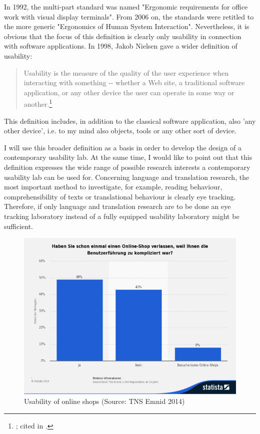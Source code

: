 \documentclass[output=paper]{langsci/langscibook}
\begin{document}
In 1992, the multi-part standard was named "Ergonomic requirements for office work with visual display terminals". From 2006 on, the standards were retitled to the more generic "Ergonomics of Human System Interaction". Nevertheless, it is obvious that the focus of this definition is clearly only usability in connection with software applications. In 1998, Jakob Nielsen gave a wider definition of usability:

\begin{quote}
Usability is the measure of the quality of the user experience when interacting with something -{}- whether a Web site, a traditional software application, or any other device the user can operate in some way or another.\footnote{ \citet{Nielsen1998}; cited in \citet{Eichinger1999}.}
\end{quote}

This definition includes, in addition to the classical software application, also 'any other device', i.e. to my mind also objects, tools or any other sort of device. 

I will use this broader definition as a basis in order to develop the design of a contemporary usability lab. At the same time, I would like to point out that this definition expresses the wide range of possible research interests a contemporary usability lab can be used for. Concerning language and translation research, the most important method to investigate, for example, reading behaviour, comprehensibility of texts or translational behaviour is clearly eye tracking. Therefore, if only language and translation research are to be done an eye tracking laboratory instead of a fully equipped usability laboratory might be sufficient.

  
\begin{figure}
 \includegraphics[width=\textwidth]{figures/Roesener1.png}
 \caption{Usability of online shops (Source: TNS Emnid 2014)}
 \label{roesener:fig:1}
\end{figure} 
 
\end{document}
